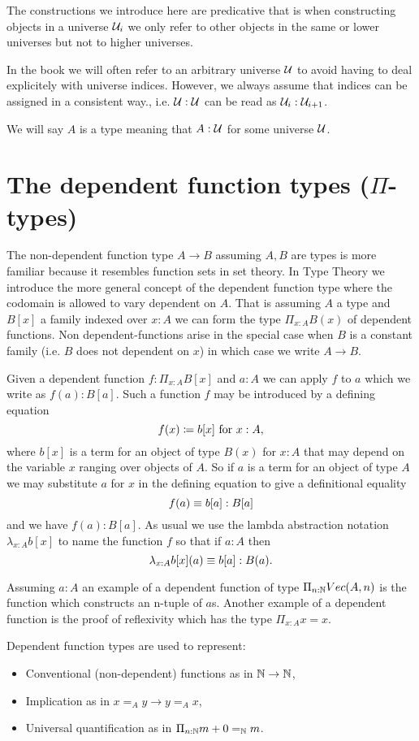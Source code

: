 The constructions we introduce here are predicative that is when
constructing objects in a universe ${\mathcal U}_i$ we only refer to other
objects in the same or lower universes but not to higher universes.

In the book we will often refer to an arbitrary universe ${\mathcal U}$ to
avoid having to deal explicitely with universe indices. However, we
always assume that indices can be assigned in a consistent way.,
i.e. ${\mathcal U} : {\mathcal U}$ can be read as ${\mathcal U}_i : {\mathcal U}_{i+1}$.

We will say $A$ is a type meaning that $A : {\mathcal U}$ for some universe
${\mathcal U}$. 

\section{The dependent function types ($\Pi$-types)}

The non-dependent function type $A \to B$ assuming $A,B$ are types is
more familiar because it resembles function sets in set theory.
In Type Theory we
introduce the more general concept of the dependent function type
where the codomain is allowed to vary dependent on $A$. That is
assuming $A$ a type and $B[x]$ a family indexed over $x:A$ we can form 
the type $\Pi_{x:A}B(x)$ of dependent functions. Non
dependent-functions arise in the special case when $B$ is a constant
family (i.e. $B$ does not dependent on $x$) in which case we write $A
\to B$. 

Given a dependent function $f : \Pi_{x:A}B[x]$ and $a : A$ we can
apply $f$ to $a$ which we write as $f(a) : B[a]$.  Such a function $f$ may be introduced by a defining equation
  \[ f(x)\coloneqq b[x]\mbox{ for } x:A,\]
where $b[x]$ is a term for an object of type $B(x)$ for $x:A$ that may depend on the variable $x$ ranging over objects of $A$.  So if $a$ is a term for an object of type $A$ we may substitute $a$ for $x$ in the defining equation to give a definitional equality
  \[ f(a)\equiv b[a]:B[a]\]
and we have $f(a):B[a]$.  As usual we use the lambda abstraction notation 
$\lambda_{x:A}b[x]$ to name the function $f$ so that if $a:A$ then
  \[\lambda_{x:A}b[x](a)\equiv b[a]: B(a).\]

Assuming $a:A$ an example of a dependent function of type $\Pi_{n:\mathbb{N}}Vec(A,n)$
is the function which constructs an n-tuple of $a$s. Another example
of a dependent function is the proof of reflexivity which has the type
$\Pi_{x:A}x = x$.

Dependent function types are used to represent:
\begin{itemize}
\item Conventional (non-dependent) functions as in $\mathbb{N} \to \mathbb{N}$,
\item Implication as in $x =_A y \to y =_A x$,
\item Universal quantification as in $\Pi_{n:\mathbb{N}}m+0 =_\mathbb{N} m$.
\end{itemize}

